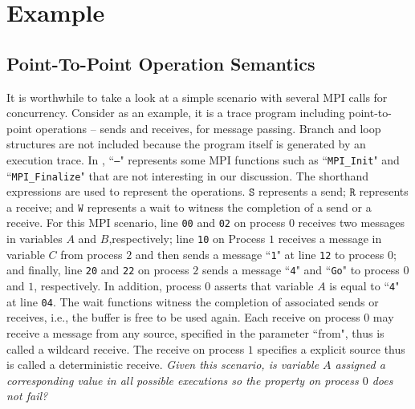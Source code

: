 \section{Example}
\subsection{Point-To-Point Operation Semantics}
It is worthwhile to take a look at a simple scenario with several MPI calls for concurrency. Consider  as an example, it is a trace program including point-to-point operations -- sends and receives, for message passing. Branch and loop structures are not included because the program itself is generated by an execution trace.
In , ``\texttt{---}" represents some MPI functions such as ``\texttt{MPI\_Init}" and ``\texttt{MPI\_Finalize}" that are not interesting in our discussion. The shorthand expressions are used to represent the operations. $\mathtt{S}$ represents a send; $\mathtt{R}$ represents a receive; and $\mathtt{W}$ represents a wait to witness the completion of a send or a receive. For this MPI scenario, line \texttt{00} and \texttt{02} on process $0$ receives two messages in variables $A$ and $B$,respectively; line \texttt{10} on Process $1$ receives a message in variable $C$ from process $2$ and then sends a message ``\texttt{1}" at line \texttt{12} to process $0$; and finally, line \texttt{20} and \texttt{22} on process $2$ sends a message ``\texttt{4}" and ``\texttt{Go}" to process $0$ and $1$, respectively. In addition, process $0$ asserts that variable $A$ is equal to ``\texttt{4}" at line \texttt{04}. The wait functions witness the completion of associated sends or receives, i.e., the buffer is free to be used again. Each receive on process $0$ may receive a message from any source, specified in the parameter ``from", thus is called a wildcard receive. The receive on process $1$ specifies a explicit source thus is called a deterministic receive. \textit{Given this scenario, is variable $A$ assigned a corresponding value in all possible executions so the property on process $0$ does not fail?}

